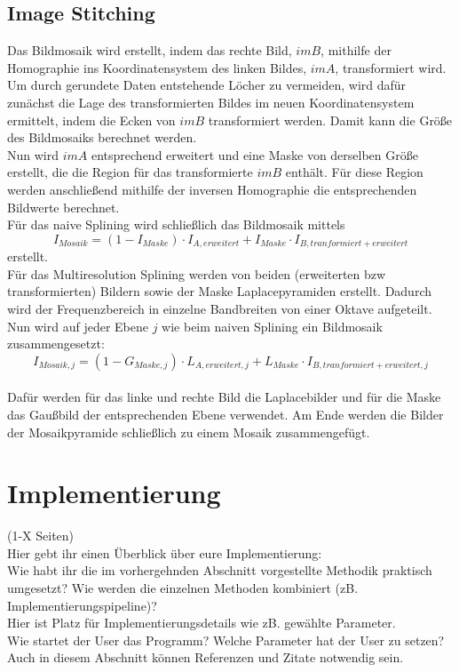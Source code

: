 \documentclass[deutsch]{scrartcl}
\begin{document}
\subsection{Image Stitching}
Das Bildmosaik wird erstellt, indem das rechte Bild, $imB$, mithilfe der Homographie ins Koordinatensystem des linken Bildes, $imA$, transformiert wird. Um durch gerundete Daten entstehende Löcher zu vermeiden, wird dafür zunächst die Lage des transformierten Bildes im neuen Koordinatensystem ermittelt, indem die Ecken von $imB$ transformiert werden. Damit kann die Größe des Bildmosaiks berechnet werden.\\
Nun wird $imA$ entsprechend erweitert und eine Maske von derselben Größe erstellt, die die Region für das transformierte $imB$ enthält. Für diese Region werden anschließend mithilfe der inversen Homographie die entsprechenden Bildwerte berechnet. \\
Für das naive Splining wird schließlich das Bildmosaik mittels 
\begin{equation}\label{naive}
	I_{Mosaik}=(1-I_{Maske})\cdot I_{A,erweitert} + I_{Maske}\cdot I_{B,tranformiert+erweitert}
\end{equation} erstellt. \\
Für das Multiresolution Splining\cite{spline83} werden von beiden (erweiterten bzw transformierten) Bildern sowie der Maske Laplacepyramiden erstellt. Dadurch wird der Frequenzbereich in einzelne Bandbreiten von einer Oktave aufgeteilt. Nun wird auf jeder Ebene $j$ wie beim naiven Splining ein Bildmosaik zusammengesetzt:
\begin{equation}\label{mrs}
	I_{Mosaik,j}=(1-G_{Maske,j})\cdot L_{A,erweitert,j} + L_{Maske}\cdot I_{B,tranformiert+erweitert,j}
\end{equation} \\ 
Dafür werden für das linke und rechte Bild die Laplacebilder und für die Maske das Gaußbild der entsprechenden Ebene verwendet. Am Ende werden die Bilder der Mosaikpyramide schließlich zu einem Mosaik zusammengefügt.


\newpage
\section{Implementierung}
(1-X Seiten)\\
Hier gebt ihr einen Überblick über eure Implementierung:\\
Wie habt ihr die im vorhergehnden Abschnitt vorgestellte Methodik praktisch umgesetzt? Wie werden die einzelnen Methoden kombiniert (zB. Implementierungspipeline)?\\
Hier ist Platz für Implementierungsdetails wie zB. gewählte Parameter. \\
Wie startet der User das Programm? Welche Parameter hat der User zu setzen?\\
Auch in diesem Abschnitt können Referenzen und Zitate notwendig sein.\\\\
\end{document}
